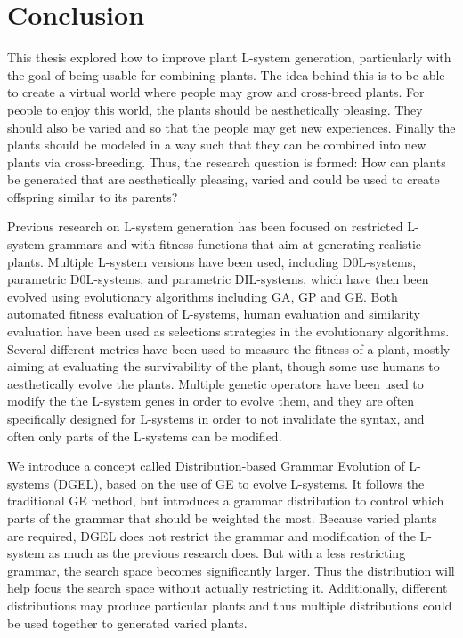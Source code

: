 \chapter{Conclusion}

This thesis explored how to improve plant \gls{L-system} generation, particularly with the goal of being usable for combining plants.
The idea behind this is to be able to create a virtual world where people may grow and cross-breed plants.
For people to enjoy this world, the plants should be aesthetically pleasing.
They should also be varied and so that the people may get new experiences.
Finally the plants should be modeled in a way such that they can be combined into new plants via cross-breeding.
Thus, the research question is formed: How can plants be generated that are aesthetically pleasing, varied and could be used to create offspring similar to its parents?

Previous research on \gls{L-system} generation has been focused on restricted \gls{L-system} grammars and with fitness functions that aim at generating realistic plants.
Multiple \gls{L-system} versions have been used, including D0L-systems, parametric D0L-systems, and parametric DIL-systems, which have then been evolved using evolutionary algorithms including \gls{GA}, \gls{GP} and \gls{GE}.
Both automated fitness evaluation of \glspl{L-system}, human evaluation and similarity evaluation have been used as selections strategies in the evolutionary algorithms.
Several different metrics have been used to measure the fitness of a plant, mostly aiming at evaluating the survivability of the plant, though some use humans to aesthetically evolve the plants.
Multiple genetic operators have been used to modify the the \gls{L-system} genes in order to evolve them, and they are often specifically designed for \glspl{L-system} in order to not invalidate the syntax, and often only parts of the \glspl{L-system} can be modified.

We introduce a concept called Distribution-based Grammar Evolution of \glspl{L-system} (DGEL), based on the use of \gls{GE} to evolve \glspl{L-system}. %
It follows the traditional \gls{GE} method, %
but introduces a grammar distribution to control which parts of the grammar that should be weighted the most.
Because varied plants are required, \gls{DGEL} does not restrict the grammar and modification of the \gls{L-system} as much as the previous research does.
But with a less restricting grammar, the search space becomes significantly larger.
Thus the distribution will help focus the search space without actually restricting it.
Additionally, different distributions may produce particular plants and thus multiple distributions could be used together to generated varied plants.

